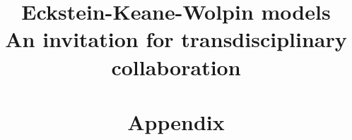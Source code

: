 
\title{Eckstein-Keane-Wolpin models\\
	\large An invitation for transdisciplinary collaboration\\
	\\
	\Huge{\textbf{Appendix}}}

\vspace{0.5cm}
\renewcommand{\baselinestretch}{1.3}\normalsize

\setcounter{page}{1}
\thispagestyle{empty}

\tableofcontents\newpage
